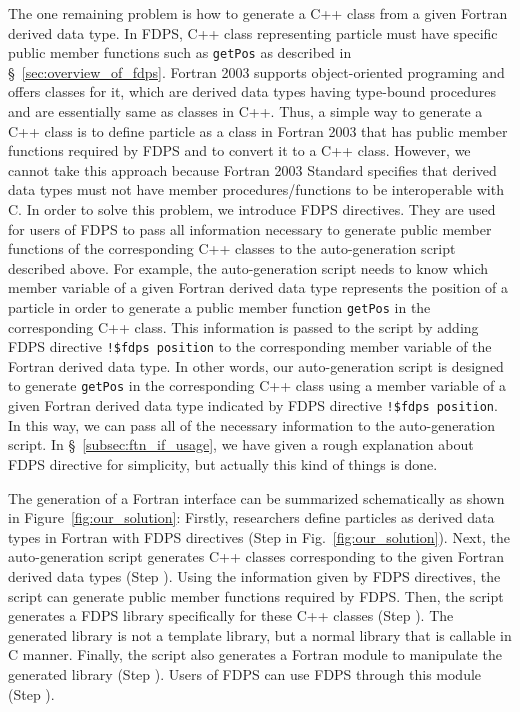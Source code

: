 \documentclass[twocolumn,useamsfonts]{pasj01}
\begin{document}
The one remaining problem is how to generate a C++ class from a given Fortran derived data type. In FDPS, C++ class representing particle must have specific public member functions such as \texttt{getPos} as described in \S~\ref{sec:overview_of_fdps}. Fortran 2003 supports object-oriented programing and offers classes for it, which are derived data types having type-bound procedures and are essentially same as classes in C++. Thus, a simple way to generate a C++ class is to define particle as a class in Fortran 2003 that has public member functions required by FDPS and to convert it to a C++ class. However, we cannot take this approach because Fortran 2003 Standard specifies that derived data types must not have member procedures/functions to be interoperable with C. In order to solve this problem, we introduce FDPS directives. They are used for users of FDPS to pass all information necessary to generate public member functions of the corresponding C++ classes to the auto-generation script described above. For example, the auto-generation script needs to know which member variable of a given Fortran derived data type represents the position of a particle in order to generate a public member function \texttt{getPos} in the corresponding C++ class. This information is passed to the script by adding FDPS directive \texttt{!\$fdps position} to the corresponding member variable of the Fortran derived data type. In other words, our auto-generation script is designed to generate \texttt{getPos} in the corresponding C++ class using a member variable of a given Fortran derived data type indicated by FDPS directive \texttt{!\$fdps position}. In this way, we can pass all of the necessary information to the auto-generation script. In \S~\ref{subsec:ftn_if_usage}, we have given a rough explanation about FDPS directive for simplicity, but actually this kind of things is done.

The generation of a Fortran interface can be summarized schematically as shown in Figure~\ref{fig:our_solution}: Firstly, researchers define particles as derived data types in Fortran with FDPS directives (Step {\large {}\hbox{}} in Fig.~\ref{fig:our_solution}). Next, the auto-generation script generates C++ classes corresponding to the given Fortran derived data types (Step {\large {}\hbox{}}). Using the information given by FDPS directives, the script can generate public member functions required by FDPS. Then, the script generates a FDPS library specifically for these C++ classes (Step {\large {}\hbox{}}). The generated library is not a template library, but a normal library that is callable in C manner. Finally, the script also generates a Fortran module to manipulate the generated library (Step {\large {}\hbox{}}). Users of FDPS can use FDPS through this module (Step {\large {}\hbox{}}).
\end{document}
